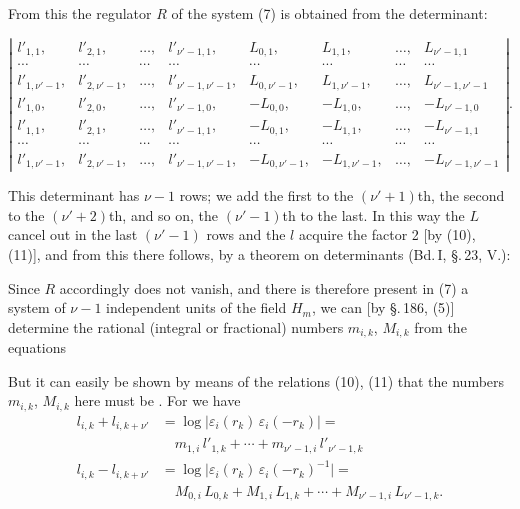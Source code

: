 
From this the regulator $R$ of the system (7) is obtained from
the determinant:

\[
\left|
\begin{array}{cccccccc}
l'_{1,1}, & l'_{2,1}, & \ldots, & l'_{\nu'-1,1}, & L_{0,1}, & L_{1,1}, & \ldots, & L_{\nu'-1,1} \\
\cdots & \cdots & \cdots & \cdots & \cdots & \cdots & \cdots & \cdots \\
l'_{1,\nu'-1}, & l'_{2,\nu'-1}, & \ldots, & l'_{\nu'-1,\nu'-1}, & L_{0,\nu'-1}, & L_{1,\nu'-1}, & \ldots, & L_{\nu'-1,\nu'-1} \\
l'_{1,0}, & l'_{2,0}, & \ldots, & l'_{\nu'-1,0}, & -L_{0,0}, & -L_{1,0}, & \ldots, & -L_{\nu'-1,0} \\
l'_{1,1}, & l'_{2,1}, & \ldots, & l'_{\nu'-1,1}, & -L_{0,1}, & -L_{1,1}, & \ldots, & -L_{\nu'-1,1} \\
\cdots & \cdots & \cdots & \cdots & \cdots & \cdots & \cdots & \cdots \\
l'_{1,\nu'-1}, & l'_{2,\nu'-1}, & \ldots, & l'_{\nu'-1,\nu'-1}, & -L_{0,\nu'-1}, & -L_{1,\nu'-1}, & \ldots, & -L_{\nu'-1,\nu'-1}
\end{array}
\right|.
\]

This determinant has $\nu-1$ rows; we add the first to the
$(\nu'+1)$th, the second to the $(\nu'+2)$th, and so on, the $(\nu'-1)$th to
the last. In this way the $L$ cancel out in the last $(\nu'-1)$ rows
and the $l$ acquire the factor 2 [by (10), (11)], and from this
there follows, by a theorem on determinants (Bd.\,I,
\S.\,23, V.):

Since $R$ accordingly does not vanish, and there is therefore
present in (7) a system of $\nu-1$ independent units of the field $H_m$,
we can [by \S.\,186, (5)] determine the rational (integral
or fractional) numbers $m_{i,k}$, $M_{i,k}$ from the equations

But it can easily be shown by means of the relations (10), (11)
that the numbers $m_{i,k}$, $M_{i,k}$ here must be .
For we have
\[
\begin{aligned}
l_{i,k} + l_{i,k+\nu'} & = \log \lvert \varepsilon_i(r_k)\, \varepsilon_i(-r_k) \rvert = \\
& \quad m_{1,i}\, l'_{1,k} + \cdots + m_{\nu'-1,i}\, l'_{\nu'-1,k} \\
l_{i,k} - l_{i,k+\nu'} & = \log \lvert \varepsilon_i(r_k)\, \varepsilon_i(-r_k)^{-1} \rvert = \\
& \quad M_{0,i}\, L_{0,k} + M_{1,i}\, L_{1,k} + \cdots + M_{\nu'-1,i}\, L_{\nu'-1,k}.
\end{aligned}
\]

